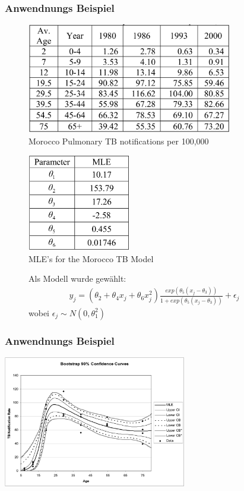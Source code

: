 \documentclass[aspectratio=1610, 9pt]{beamer}
\begin{document}
\begin{frame}
  \frametitle{Anwendnungs Beispiel}
  \begin{minipage}[t]{0.48\linewidth}
	  \begin{figure}
	    \includegraphics[width=0.8\textwidth]{images/5.png}
	    \caption{Morocco Pulmonary TB notifications per 100,000}
	  \end{figure}
  \end{minipage} 
  \begin{minipage}[t]{0.48\linewidth}
	  \begin{figure}
	    \includegraphics[width=0.4\textwidth]{images/6.png}
	    \caption{MLE’s for the Morocco TB Model}
	  \end{figure}
	\end{minipage}
	\begin{figure}
	  Als Modell wurde gewählt: 
		\begin{align*}
		    y_j = (\theta_2 + \theta_4 x_j + \theta_6 x^2_j)
			  \frac{
			    exp(\theta_5(x_j - \theta_3))}{
			    1 + exp(\theta_5(x_j - \theta_3))
			  } + \epsilon_j
		\end{align*}
		wobei $\epsilon_j \sim N(0, \theta_1^2)$
	\end{figure}
\end{frame}

\begin{frame}
  \frametitle{Anwendnungs Beispiel}
  \begin{center}
    \includegraphics[width=0.6\textwidth]{images/1.png}
  \end{center}
\end{frame}
\end{document}
